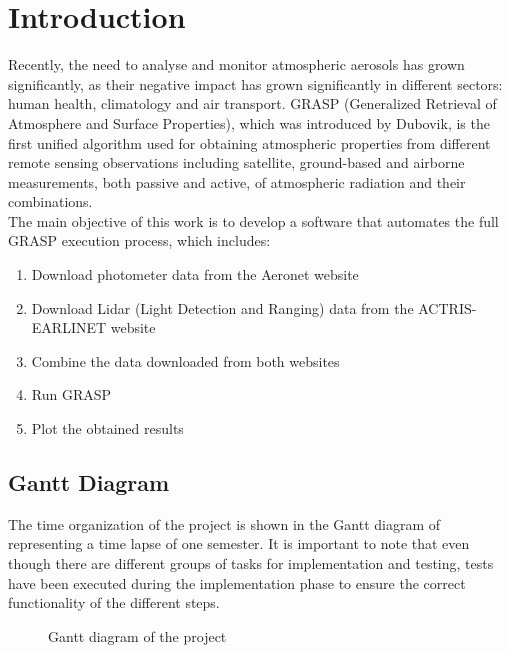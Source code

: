 \clearpage
\newpage
\section{Introduction}
Recently, the need to analyse and monitor atmospheric aerosols has grown significantly, as their negative impact has grown significantly in different sectors: human health, climatology and air transport. GRASP (Generalized Retrieval of Atmosphere and Surface Properties), which was introduced by Dubovik, is the first unified algorithm used for obtaining atmospheric properties from different remote sensing observations including satellite, ground-based and airborne measurements, both passive and active, of atmospheric radiation and their combinations\cite{grasp}.\smallskip\\
The main objective of this work is to develop a software that automates the full GRASP execution process, which includes:
\begin{enumerate}
    \item Download photometer data from the Aeronet website
    \item Download Lidar (Light Detection and Ranging) data from the ACTRIS-EARLINET website
    \item Combine the data downloaded from both websites
    \item Run GRASP
    \item Plot the obtained results
\end{enumerate}
\subsection{Gantt Diagram}
The time organization of the project is shown in the Gantt diagram of  representing a time lapse of one semester. It is important to note that even though there are different groups of tasks for implementation and testing, tests have been executed during the implementation phase to ensure the correct functionality of the different steps.
\label{ssec:gantt}
\begin{figure}[H]
    \centering
    
    \caption[Project's Gantt diagram]{\footnotesize{Gantt diagram of the project}}
    \label{fig:gantt}
\end{figure}
